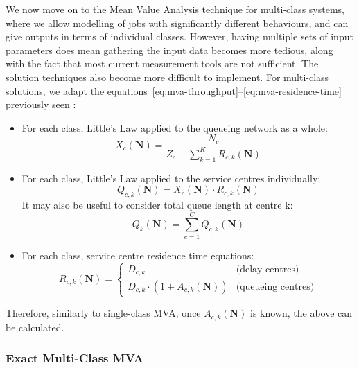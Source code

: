 We now move on to the Mean Value Analysis technique for multi-class systems, where we allow modelling of jobs with significantly different behaviours, and can give outputs in terms of individual classes. However, having multiple sets of input parameters does mean gathering the input data becomes more tedious, along with the fact that most current measurement tools are not sufficient. The solution techniques also become more difficult to implement. For multi-class solutions, we adapt the equations~\eqref{eq:mva-throughput}–\eqref{eq:mva-residence-time} previously seen \cite{lazowska84}:

\begin{itemize}
\item For each class, Little's Law applied to the queueing network as a whole:
\begin{equation}
X_c(\mathbf{N}) = \frac{N_c}{Z_c + \sum_{k=1}^{K} R_{c,k}(\mathbf{N})}
\label{eq:mva-mc-throughput}
\end{equation}

\item For each class, Little's Law applied to the service centres individually:
\begin{equation}
Q_{c,k}(\mathbf{N}) = X_c(\mathbf{N}) \cdot R_{c,k}(\mathbf{N})
\label{eq:mva-mc-queue-length}
\end{equation}
It may also be useful to consider total queue length at centre k:
\begin{equation*}
Q_k(\mathbf{N}) = \sum_{c=1}^{C} Q_{c,k}(\mathbf{N})
\end{equation*}

\item For each class, service centre residence time equations:
\begin{equation}
R_{c,k}(\mathbf{N}) = \begin{cases}
D_{c,k} & \text{(delay centres)} \\
D_{c,k} \cdot (1 + A_{c,k}(\mathbf{N})) & \text{(queueing centres)}
\end{cases}
\label{eq:mva-mc-residence-time}
\end{equation}
\end{itemize} 

Therefore, similarly to single-class MVA, once $A_{c,k}(\mathbf{N})$ is known, the above can be calculated.

\subsubsection*{Exact Multi-Class MVA}


